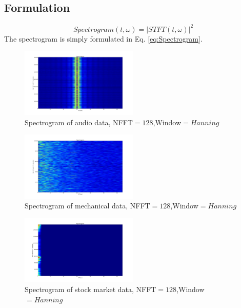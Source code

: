 \documentclass[journal]{IEEEtran}
\begin{document}
\subsection{Formulation}
\begin{equation}
    Spectrogram(t,\omega) = \lvert STFT(t,\omega) \rvert ^2
    \label{eq:Spectrogram}
\end{equation}
The spectrogram is simply formulated in Eq. \ref{eq:Spectrogram}. \cite{DSPBook}

\begin{figure}[h!]
\centering
  \includegraphics[width=0.5\textwidth]{wav_spectrogram_plot.png}
\caption{Spectrogram of audio data, NFFT$=128$,Window$=Hanning$}
\label{fig:WAVSpectrogram}
\end{figure}

\begin{figure}[h!]
\centering
  \includegraphics[width=0.5\textwidth]{matfile_spectrogram_plot.png}
\caption{Spectrogram of mechanical data, NFFT$=128$,Window$=Hanning$}
\label{fig:MatSpectrogram}
\end{figure}

\begin{figure}[h!]
\centering
  \includegraphics[width=0.5\textwidth]{stock_spectrogram_plot.png}
\caption{Spectrogram of stock market data, NFFT$=128$,Window$=Hanning$}
\label{fig:StockSpectrogram}
\end{figure}
\end{document}

